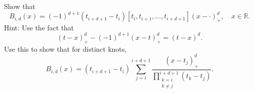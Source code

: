 \begin{exercise}
    Show that
    \begin{equation*}
        B_{i, d}(x) = (-1)^{d+1} (t_{i+d+1} - t_i) [t_i, t_{i+1}, \ldots, t_{i+d+1}] (x - \cdot)_+^{d},
        \quad x \in \mathbb{R}.
    \end{equation*}
    Hint: Use the fact that
    \begin{equation*}
        (t - x)_{+}^{d} - (-1)^{d+1} (x - t)_{+}^{d} = (t - x)^d.
    \end{equation*}
    Use this to show that for distinct knots,
    \begin{equation*}
        B_{i,d}(x) = (t_{i+d+1} - t_i) \sum_{j = i}^{i + d + 1} \frac{(x - t_j)_+^d}{\prod_{\substack{k = i \\ k \neq j}}^{i + d + 1} (t_k - t_j)}.
    \end{equation*}
\end{exercise}

